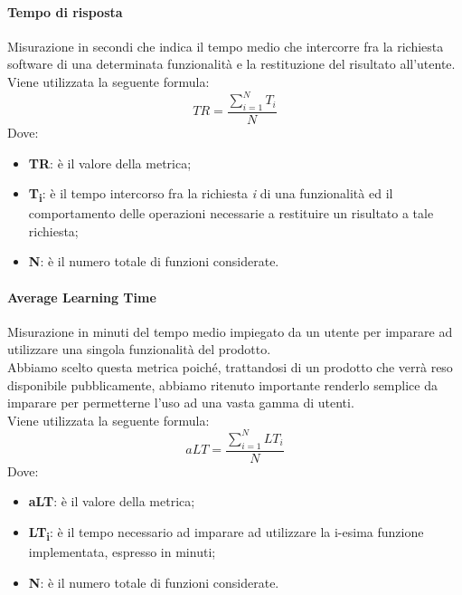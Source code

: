 \paragraph{Tempo di risposta}\Spazio
Misurazione in secondi che indica il tempo medio che intercorre fra la richiesta software di una determinata funzionalità e la restituzione del risultato all'utente. \\
Viene utilizzata la seguente formula:
$$TR=\frac{\sum\limits_{i=1}^N{T_i}}{N}$$
Dove:
\begin{itemize}
	\item{\textbf{TR}: è il valore della metrica;}
	\item{\textbf{T\textsubscript{i}}: è il tempo intercorso fra la richiesta \emph{i} di una funzionalità ed il comportamento delle operazioni necessarie a restituire un risultato a tale richiesta;}
	\item{\textbf{N}: è il numero totale di funzioni considerate.}
\end{itemize}

\paragraph{Average Learning Time}\Spazio
Misurazione in minuti del tempo medio impiegato da un utente per imparare ad utilizzare una singola funzionalità del prodotto.
\\Abbiamo scelto questa metrica poiché, trattandosi di un prodotto che verrà reso disponibile pubblicamente, abbiamo ritenuto importante renderlo semplice da imparare per permetterne l'uso ad una vasta gamma di utenti.
\\Viene utilizzata la seguente formula:
$$aLT=\frac{\sum\limits_{i=1}^N{LT_i}}{N}$$
Dove:
\begin{itemize}
	\item{\textbf{aLT}: è il valore della metrica;}
	\item{\textbf{LT\textsubscript{i}}: è il tempo necessario ad imparare ad utilizzare la i-esima funzione implementata, espresso in minuti;}
	\item{\textbf{N}: è il numero totale di funzioni considerate.}
\end{itemize}

